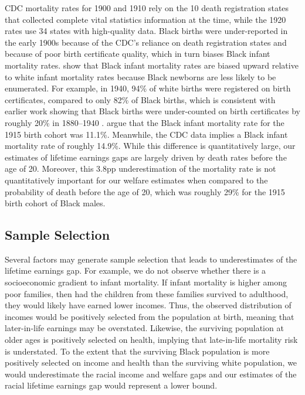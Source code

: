 \documentclass[12pt]{article}
\begin{document}
CDC mortality rates for 1900 and 1910 rely on the 10 death registration states that collected complete vital statistics information at the time, while the 1920 rates use 34 states with high-quality data. 
Black births were under-reported in the early 1900s because of the CDC's reliance on death registration states and because of poor birth certificate quality, which in turn biases Black infant mortality rates. 
 show that Black infant mortality rates are biased upward relative to white infant mortality rates because Black newborns are less likely to be enumerated. 
For example, in 1940, 94\% of white births were registered on birth certificates, compared to only 82\% of Black births, which is consistent with earlier work showing that Black births were under-counted on birth certificates by roughly 20\% in 1880--1940 . 
 argue that the Black infant mortality rate for the 1915 birth cohort was 11.1\%. Meanwhile, the CDC data \citep[Table 20 in][]{arias_united_2015} implies a Black infant mortality rate of roughly 14.9\%. 
While this difference is quantitatively large, our estimates of lifetime earnings gaps are largely driven by death rates before the age of 20. 
Moreover, this 3.8pp underestimation of the mortality rate is not quantitatively important for our welfare estimates when compared to the probability of death before the age of 20, which was roughly 29\% for the 1915 birth cohort of Black males.

\subsection{Sample Selection\label{sec:sample-selection}}

Several factors may generate sample selection that leads to underestimates of the lifetime earnings gap. 
For example, we do not observe whether there is a socioeconomic gradient to infant mortality. 
If infant mortality is higher among poor families, then had the children from these families survived to adulthood, they would likely have earned lower incomes.
Thus, the observed distribution of incomes would be positively selected from the population at birth, meaning that later-in-life earnings may be overstated.
Likewise, the surviving population at older ages is positively selected on health, implying that late-in-life mortality risk is understated.  
To the extent that the surviving Black population is more positively selected on income and health than the surviving white population, we would underestimate the racial income and welfare gaps and our estimates of the racial lifetime earnings gap would represent a lower bound. 
\end{document}
